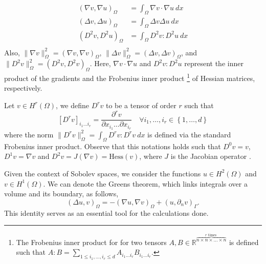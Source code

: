 \documentclass[11pt]{article}
\theoremstyle{remark}
\renewcommand{\le}{\leqslant}
\numberwithin{equation}{section}
\begin{document}
\begin{equation}
\begin{split}
( \nabla v, \nabla u)_{\Omega } & = \int_{\Omega } \nabla v \cdot \nabla u \ dx \\
( \Delta v, \Delta u)_{\Omega } & = \int_{\Omega } \Delta v \Delta u \ dx \\
( D^2 v, D^2 u)_{\Omega } & = \int_{\Omega } D^2 v : D^2 u \ dx \\
\end{split}
\end{equation}
Also, $ \|  \nabla v\|_{  \Omega}^{2} = ( \nabla v, \nabla v)_{\Omega}$, $ \|   \Delta v \|_{\Omega}^{2} = (\Delta v, \Delta v)_{\Omega}$, and $ \| D^2 v \|_{ \Omega}^{2} = (D^2 v, D^2 v)_{\Omega}$.
Here, $\nabla v \cdot \nabla u$ and $D^2 v : D^2 u$ represent the inner product of the gradients and the Frobenius inner product \footnote{
The Frobenius inner product for for two tensors $A, B \in \mathbb{R} ^{\overbrace{n \times n \times \ldots \times n}^{r \text{ times }} } $ is defined such that $ A:B = \sum_{1\le  i_{1}, \ldots, i_{r} \le  d}^{} A_{i_{1} \ldots i_{r}} B_{i_{1}
    \ldots
i_{r}}  $.
} of Hessian matrices, respectively.

Let $v \in H^{r}( \Omega ) $, we define $D^r v$ to be a tensor of order $r$ such that
\begin{equation}
    \label{eq:tensor}
\left[ D^r v \right] _{i_{1} \ldots i_{r}} = \frac{\partial^r v}{\partial x_{ i_{1} } \ldots \partial x_{ i_{r} } } \quad  \forall i_{1}, \ldots, i_{r} \in \left\{ 1,\ldots,d \right\}
\end{equation}
where the norm $\| D^r v\|_{\Omega   }^{ 2 } =
\int_{\Omega }^{} D^r v : D^r v \ dx$ is defined via the standard Frobenius inner product. Observe that this notations holds such that $D^{0} v = v$, $ D^{1} v = \nabla v $ and $D ^{2} v  = J(\nabla v) = \mathrm{Hess}(v)$, where $J$ is the Jacobian operator .

Given the context of Sobolev spaces, we consider the functions $ u \in H^{2}( \Omega )$ and $ v \in H^{1}( \Omega )$. We can denote the Greens theorem, which links integrals over a volume and its boundary, as follows,
\begin{equation}
( \Delta u, v) _{\Omega } = -( \nabla u, \nabla v)_{\Omega } + ( u, \partial _{n}v)_{\Gamma }.
\end{equation}
This identity serves as an essential tool for the calculations done.
\end{document}
